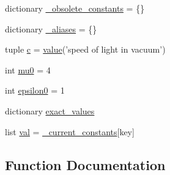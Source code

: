 \begin{DoxyCompactItemize}
\item 
dictionary \hyperlink{namespacescipy_1_1constants_1_1codata_a02842cc4bb72b49d72ef98923fe86cdb}{\+\_\+obsolete\+\_\+constants} = \{\}
\item 
dictionary \hyperlink{namespacescipy_1_1constants_1_1codata_ae8e767525822698e3b3ca1b859af4602}{\+\_\+aliases} = \{\}
\item 
tuple \hyperlink{namespacescipy_1_1constants_1_1codata_a34f27fcdaeb8d0516ce3f92669bd12dc}{c} = \hyperlink{namespacescipy_1_1constants_1_1codata_afca52bd411a99b9f442351e1ae94be8e}{value}('speed of light in vacuum')
\item 
int \hyperlink{namespacescipy_1_1constants_1_1codata_ad07cc61c7172f08ff1bbc8dc1d6066e5}{mu0} = 4
\item 
int \hyperlink{namespacescipy_1_1constants_1_1codata_a51d9bf3362bbbc2576e1aeef550ed695}{epsilon0} = 1
\item 
dictionary \hyperlink{namespacescipy_1_1constants_1_1codata_ab2921da85ab8381d529d2907587a208b}{exact\+\_\+values}
\item 
list \hyperlink{namespacescipy_1_1constants_1_1codata_a0eae1e2cc3d8419fc20b07620c03da9a}{val} = \hyperlink{namespacescipy_1_1constants_1_1codata_a4f04c7b64ec166ee658accb7bb8a645c}{\+\_\+current\+\_\+constants}\mbox{[}key\mbox{]}
\end{DoxyCompactItemize}


\subsection{Function Documentation}
\hypertarget{namespacescipy_1_1constants_1_1codata_a1de599528c526e369e919ee33ea5a0fc}{}
